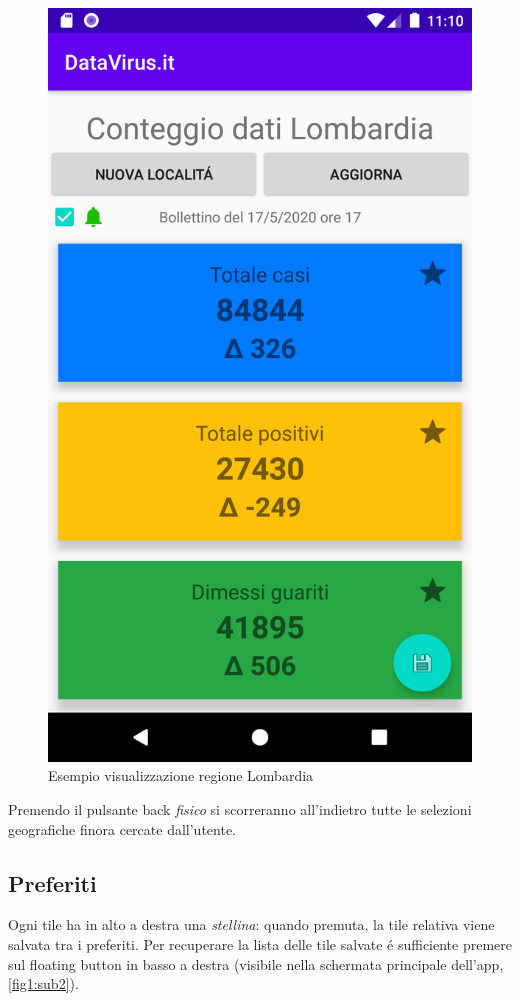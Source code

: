 \documentclass{article}
\begin{document}
    \begin{figure}[h]
        \centering
        \includegraphics[width=.5\linewidth]{lombardia.png}
        \caption{Esempio visualizzazione regione Lombardia}
        \label{fig3}
    \end{figure}

    Premendo il pulsante back \emph{fisico} si scorreranno all'indietro tutte le selezioni geografiche finora cercate dall'utente.

    \subsection{Preferiti}
    Ogni tile ha in alto a destra una \emph{stellina}: quando premuta, la tile relativa viene salvata tra i preferiti.
    Per recuperare la lista delle tile salvate é sufficiente premere sul floating button in basso a destra (visibile nella schermata principale dell'app, \ref{fig1:sub2}).
\end{document}
